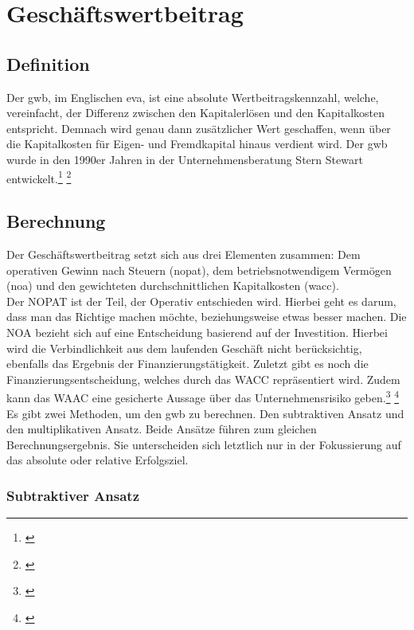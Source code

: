 \chapter{Geschäftswertbeitrag}
\label{Geschaeftswertbeitrag}

\section{Definition}

Der \ac{gwb}, im Englischen \ac{eva}, ist eine absolute Wertbeitragskennzahl, welche, vereinfacht, der Differenz zwischen den Kapitalerlösen und den Kapitalkosten entspricht. Demnach wird genau dann zusätzlicher Wert geschaffen, wenn über die Kapitalkosten für Eigen- und Fremdkapital hinaus verdient wird. Der \ac{gwb} wurde in den 1990er Jahren in der Unternehmensberatung Stern Stewart entwickelt.\footnote{\cite{wikipedia-eva}} \footnote{\cite{controlling-eva}}

\section{Berechnung}

Der Geschäftswertbeitrag setzt sich aus drei Elementen zusammen: Dem operativen Gewinn nach Steuern (\ac{nopat}), dem betriebsnotwendigem Vermögen (\ac{noa}) und den gewichteten durchschnittlichen Kapitalkosten (\ac{wacc}).\\

Der NOPAT ist der Teil, der Operativ entschieden wird. Hierbei geht es darum, dass man das Richtige machen möchte, beziehungsweise etwas besser machen. Die NOA bezieht sich auf eine Entscheidung basierend auf der Investition. Hierbei wird die Verbindlichkeit aus dem laufenden Geschäft nicht berücksichtig, ebenfalls das Ergebnis der Finanzierungstätigkeit. Zuletzt gibt es noch die Finanzierungsentscheidung, welches durch das WACC repräsentiert wird. Zudem kann das WAAC eine gesicherte Aussage über das Unternehmensrisiko geben.\footnote{\cite{bwllexicon-eva}} \footnote{\cite{wikipedia-eva}}\\ %

\noindent
Es gibt zwei Methoden, um den \ac{gwb} zu berechnen. Den subtraktiven Ansatz und den multiplikativen Ansatz. Beide Ansätze führen zum gleichen Berechnungsergebnis. Sie unterscheiden sich letztlich nur in der Fokussierung auf das absolute oder relative Erfolgsziel.

\subsection{Subtraktiver Ansatz}

